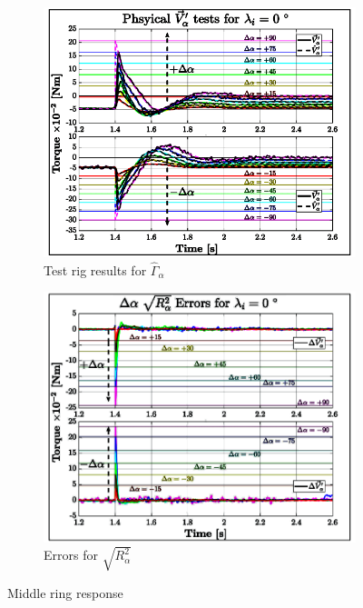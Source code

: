 \begin{figure}[htbp]
\centering
\begin{subfigure}{0.49\textwidth}
\centering
\includegraphics[width=\textwidth]{graphs/tau-alpha}
\caption{Test rig results for $\hat{\Gamma}_\alpha$}
\label{fig:tau-alpha}
\end{subfigure}
\begin{subfigure}{0.49\textwidth}
\centering
\includegraphics[width=\textwidth]{graphs/tau-alpha-r}
\caption{Errors for $\sqrt{R^2_{\alpha}}$}
\label{fig:tau-alpha-r}
\end{subfigure}
\vspace{-8pt}
\caption{Middle ring response}
\label{fig:middle-response-test}
\vspace{-16pt}
\end{figure}
